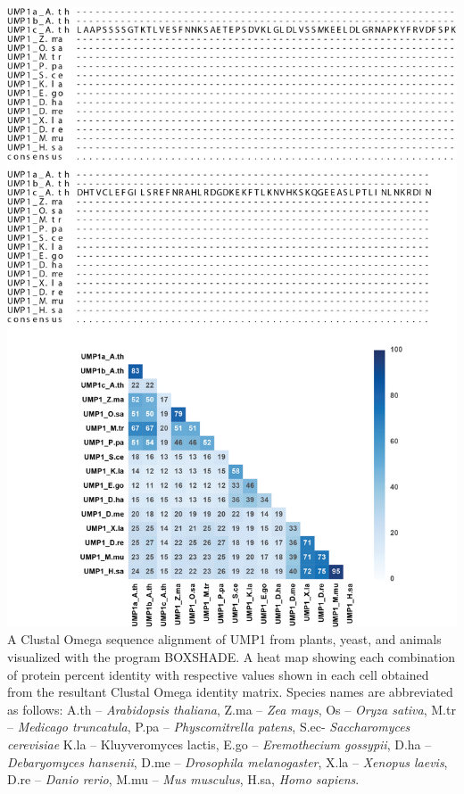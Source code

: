 \begin{FPfigure}
	\ContinuedFloat
	\centering
	\includegraphics[width=\columnwidth]{Proteasome/ump1align2.png}
	{A Clustal Omega \citep{sievers14} sequence alignment of UMP1 from plants, yeast, and animals visualized with the program BOXSHADE. A heat map showing each combination of protein percent identity with respective values shown in each cell obtained from the resultant Clustal Omega identity matrix. Species names are abbreviated as follows: A.th – \textit{Arabidopsis thaliana}, Z.ma – \textit{Zea mays}, Os – \textit{Oryza sativa}, M.tr – \textit{Medicago truncatula}, P.pa – \textit{Physcomitrella patens}, S.ec- \textit{Saccharomyces cerevisiae} K.la – {Kluyveromyces lactis}, E.go – \textit{Eremothecium gossypii}, D.ha – \textit{Debaryomyces hansenii}, D.me – \textit{Drosophila melanogaster}, X.la – \textit{Xenopus laevis}, D.re – \textit{Danio rerio}, M.mu – \textit{Mus musculus}, H.sa, \textit{Homo sapiens}.}
	\label{fig:ump1align2}
\end{FPfigure}
